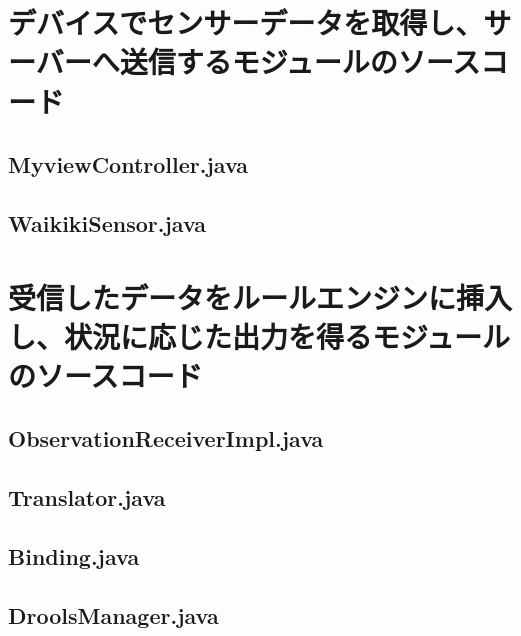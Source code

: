 \documentclass{kuisthesis}			%
\begin{document}
\section{デバイスでセンサーデータを取得し、サーバーへ送信するモジュールのソースコード}
\subsection{MyviewController.java}


\subsection{WaikikiSensor.java}


\section{受信したデータをルールエンジンに挿入し、状況に応じた出力を得るモジュールのソースコード}

\subsection{ObservationReceiverImpl.java}


\subsection{Translator.java}


\subsection{Binding.java}


\subsection{DroolsManager.java}

\end{document}
